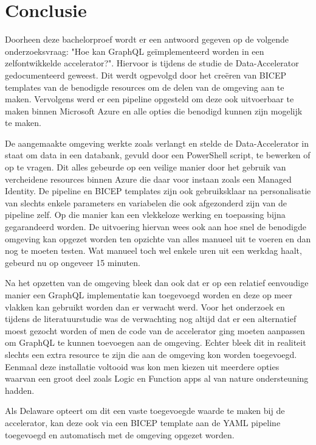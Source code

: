 
\chapter{Conclusie}%
\label{ch:conclusie}
Doorheen deze bachelorproef wordt er een antwoord gegeven op de volgende onderzoeksvraag: "Hoe kan GraphQL geïmplementeerd worden in een zelfontwikkelde accelerator?". Hiervoor is tijdens de studie de Data-Accelerator gedocumenteerd geweest. Dit werdt ogpevolgd door het creëren van BICEP templates van de benodigde resources om de delen van de omgeving aan te maken. Vervolgens werd er een pipeline opgesteld om deze ook uitvoerbaar te maken binnen Microsoft Azure en alle opties die benodigd kunnen zijn mogelijk te maken.

De aangemaakte omgeving werkte zoals verlangt en stelde de Data-Accelerator in staat om data in een databank, gevuld door een PowerShell script, te bewerken of op te vragen. Dit alles gebeurde op een veilige manier door het gebruik van vercheidene resources binnen Azure die daar voor instaan zoals een Managed Identity. De pipeline en BICEP templates zijn ook gebruiksklaar na personalisatie van slechts enkele parameters en variabelen die ook afgezonderd zijn van de pipeline zelf. Op die manier kan een vlekkeloze werking en toepassing bijna gegarandeerd worden. De uitvoering hiervan wees ook aan hoe snel de benodigde omgeving kan opgezet worden ten opzichte van alles manueel uit te voeren en dan nog te moeten testen. Wat manueel toch wel enkele uren uit een werkdag haalt, gebeurd nu op ongeveer 15 minuten.

Na het opzetten van de omgeving bleek dan ook dat er op een relatief eenvoudige manier een GraphQL implementatie kan toegevoegd worden en deze op meer vlakken kan gebruikt worden dan er verwacht werd. Voor het onderzoek en tijdens de literatuurstudie was de verwachting nog altijd dat er een alternatief moest gezocht worden of men de code van de accelerator ging moeten aanpassen om GraphQL te kunnen toevoegen aan de omgeving. Echter bleek dit in realiteit slechts een extra resource te zijn die aan de omgeving kon worden toegevoegd. Eenmaal deze installatie voltooid was kon men kiezen uit meerdere opties waarvan een groot deel zoals Logic en Function apps al van nature ondersteuning hadden.

Als Delaware opteert om dit een vaste toegevoegde waarde te maken bij de accelerator, kan deze ook via een BICEP template aan de YAML pipeline toegevoegd en automatisch met de omgeving opgezet worden.

